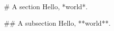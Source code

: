 \documentclass{article}
\begin{document}
# A section
Hello, *world*.

## A subsection
Hello, **world**.
\end{document}
